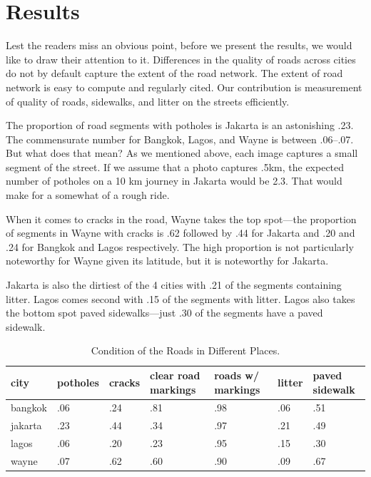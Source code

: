 \documentclass[12pt, letterpaper]{article}
\begin{document}
\section*{Results}
Lest the readers miss an obvious point, before we present the results, we would like to draw their attention to it. Differences in the quality of roads across cities do not by default capture the extent of the road network. The extent of road network is easy to compute and regularly cited. Our contribution is  measurement of quality of roads, sidewalks, and litter on the streets efficiently.

The proportion of road segments with potholes is Jakarta is an astonishing .23. The commensurate number for Bangkok, Lagos, and Wayne is between .06--.07. But what does that mean? As we mentioned above, each image captures a small segment of the street. If we assume that a photo captures .5km, the expected number of potholes on a 10 km journey in Jakarta would be 2.3. That would make for a somewhat of a rough ride.

When it comes to cracks in the road, Wayne takes the top spot---the proportion of segments in Wayne with cracks is .62 followed by .44 for Jakarta and .20 and .24 for Bangkok and Lagos respectively. The high proportion is not particularly noteworthy for Wayne given its latitude, but it is noteworthy for Jakarta. 

Jakarta is also the dirtiest of the 4 cities with .21 of the segments containing litter.  Lagos comes second with .15 of the segments with litter. Lagos also takes the bottom spot paved sidewalks---just .30 of the segments have a paved sidewalk.

\begin{table}[h]
\centering
\caption{Condition of the Roads in Different Places.}
\label{my-label}
\begin{tabular}{@{}lllllll@{}}
\toprule
city    & potholes & cracks & clear road markings & roads w/ markings & litter & paved sidewalk \\ \midrule
bangkok & .06      & .24    & .81                 & .98               & .06    & .51            \\
jakarta & .23      & .44    & .34                 & .97               & .21    & .49            \\
lagos   & .06      & .20    & .23                 & .95               & .15    & .30            \\
wayne   & .07      & .62    & .60                 & .90               & .09    & .67            \\ \bottomrule
\end{tabular}
\end{table}
\end{document}
